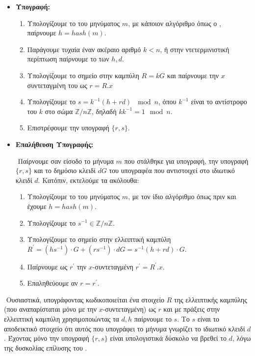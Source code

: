 \documentclass[oneside,a4paper]{article}
\begin{document}
\vspace*{0.3cm}
\begin{itemize}
	\item \textbf{Υπογραφή:}
	\begin{enumerate}
		\item Υπολογίζουμε το  του μηνύματος $m$, με κάποιον  αλγόριθμο όπως ο , παίρνουμε $h=hash(m)$.
		\item Παράγουμε τυχαία έναν ακέραιο αριθμό $k < n$, ή στην ντετερμινιστική περίπτωση παίρνουμε το  των $h,d$.
		\item Υπολογίζουμε το σημείο στην καμπύλη $R = kG$ και παίρνουμε την $x$ συντεταγμένη του ως $r = R.x$
		\item Υπολογίζουμε το $s = k^{-1} (h+rd) \ \mod n$, όπου $k^{-1}$ είναι το αντίστροφο του $k$ στο σώμα $\mathbb{Z}/n\mathbb{Z}$, δηλαδή $k k^{-1} = 1 \mod n$.
		\item Επιστρέφουμε την υπογραφή $\{r,s\}$.
	\end{enumerate}

	\vspace*{0.3cm}

	\item \textbf{Επαλήθευση Υπογραφής:}
	
	$ $\newline
	Παίρνουμε σαν είσοδο το μήνυμα $m$ που στάλθηκε για υπογραφή, την υπογραφή $\{r,s\}$ και το δημόσιο κλειδί $dG$ του υπογραφέα που αντιστοιχεί στο ιδιωτικό κλειδί $d$. Κατόπιν, εκτελούμε τα ακόλουθα:
	\begin{enumerate}
		\item Υπολογίζουμε το  του μηνύματος $m$, με τον ίδιο αλγόριθμο όπως πριν και έχουμε $h=hash(m)$.
		\item Υπολογίζουμε το $s^{-1} \in \mathbb{Z}/n \mathbb{Z}$.
		\item Υπολογίζουμε το σημείο στην ελλειπτική καμπύλη $R^{\prime} = (h s^{-1})\cdot G + (r s^{-1})\cdot dG = s^{-1}(h+rd) \cdot G$.
		\item Παίρνουμε ως $r^{\prime}$ την $x$-συντεταγμένη $r^{\prime} = R^{\prime}.x$.
		\item Επαληθεύουμε αν $r=r^{\prime}$.
	\end{enumerate}
\end{itemize}

$ $\newline
Ουσιαστικά, υπογράφοντας κωδικοποιείται ένα στοιχείο $R$ της ελλειπτικής καμπύλης (που αναπαρίσταται μόνο με την $x$-συντεταγμένη) ως $r$ και με πράξεις στην ελλειπτική καμπύλη χρησιμοποιώντας τα $d,h$ παίρνουμε το $s$. Το $s$ είναι το αποδεικτικό στοιχείο ότι αυτός που υπογράφει το μήνυμα γνωρίζει το ιδιωτικό κλειδί $d$. Έχοντας μόνο την υπογραφή $\{r,s\}$ είναι υπολογιστικά δύσκολο να βρεθεί το $d$, λόγω της δυσκολίας επίλυσης του .
\end{document}
